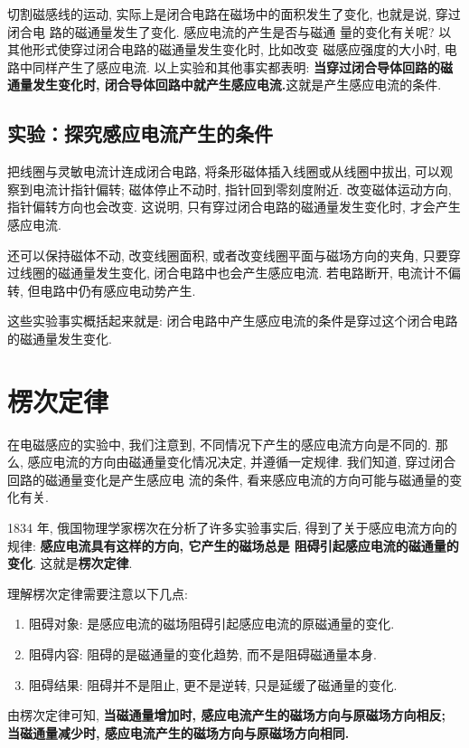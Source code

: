 \documentclass[11pt,a4paper]{ctexbook}
\begin{document}
切割磁感线的运动, 实际上是闭合电路在磁场中的面积发生了变化, 也就是说, 穿过闭合电
路的磁通量发生了变化. 感应电流的产生是否与磁通
量的变化有关呢? 以其他形式使穿过闭合电路的磁通量发生变化时, 比如改变
磁感应强度的大小时, 电路中同样产生了感应电流. 以上实验和其他事实都表明: \textbf{当穿过闭合导体回路的磁
通量发生变化时, 闭合导体回路中就产生感应电流.}这就是产生感应电流的条件.



\subsection{实验：探究感应电流产生的条件}

把线圈与灵敏电流计连成闭合电路, 将条形磁体插入线圈或从线圈中拔出, 可以观察到电流计指针偏转; 磁体停止不动时, 指针回到零刻度附近. 改变磁体运动方向, 指针偏转方向也会改变. 这说明, 只有穿过闭合电路的磁通量发生变化时, 才会产生感应电流.

还可以保持磁体不动, 改变线圈面积, 或者改变线圈平面与磁场方向的夹角, 只要穿过线圈的磁通量发生变化, 闭合电路中也会产生感应电流. 若电路断开, 电流计不偏转, 但电路中仍有感应电动势产生.

这些实验事实概括起来就是: 闭合电路中产生感应电流的条件是穿过这个闭合电路的磁通量发生变化.

\section{楞次定律}

在电磁感应的实验中, 我们注意到, 不同情况下产生的感应电流方向是不同的.
那么, 感应电流的方向由磁通量变化情况决定, 并遵循一定规律.
我们知道, 穿过闭合回路的磁通量变化是产生感应电
流的条件, 看来感应电流的方向可能与磁通量的变化有关.

1834 年, 俄国物理学家楞次在分析了许多实验事实后,
得到了关于感应电流方向的规律: \textbf{感应电流具有这样的方向, 它产生的磁场总是
阻碍引起感应电流的磁通量的变化}. 这就是\textbf{楞次定律}.

理解楞次定律需要注意以下几点:
\begin{enumerate}
    \item 阻碍对象: 是感应电流的磁场阻碍引起感应电流的原磁通量的变化.
    \item 阻碍内容: 阻碍的是磁通量的变化趋势, 而不是阻碍磁通量本身.
    \item 阻碍结果: 阻碍并不是阻止, 更不是逆转, 只是延缓了磁通量的变化.
\end{enumerate}

由楞次定律可知, \textbf{当磁通量增加时, 感应电流产生的磁场方向与原磁场方向相反; 当磁通量减少时, 感应电流产生的磁场方向与原磁场方向相同.}
\end{document}

